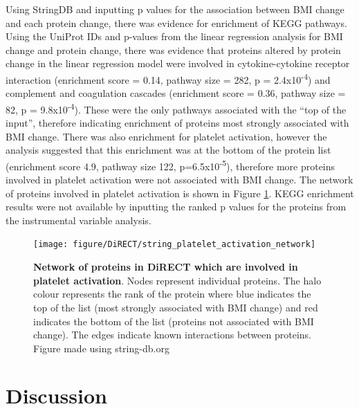 \documentclass[11pt,twoside]{bristolthesis}
\newcommand{\blandscape}{\begin{landscape}}
\newcommand{\elandscape}{\end{landscape}}
\begin{document}
Using StringDB and inputting p values for the association between BMI change and each protein change, there was evidence for enrichment of KEGG pathways. Using the UniProt IDs and p-values from the linear regression analysis for BMI change and protein change, there was evidence that proteins altered by protein change in the linear regression model were involved in cytokine-cytokine receptor interaction (enrichment score = 0.14, pathway size = 282, p = 2.4x10\textsuperscript{-4}) and complement and coagulation cascades (enrichment score = 0.36, pathway size = 82, p = 9.8x10\textsuperscript{-4}). These were the only pathways associated with the ``top of the input'', therefore indicating enrichment of proteins most strongly associated with BMI change. There was also enrichment for platelet activation, however the analysis suggested that this enrichment was at the bottom of the protein list (enrichment score 4.9, pathway size 122, p=6.5x10\textsuperscript{-5}), therefore more proteins involved in platelet activation were not associated with BMI change. The network of proteins involved in platelet activation is shown in Figure \ref{fig:platelet-enrichment}. KEGG enrichment results were not available by inputting the ranked p values for the proteins from the instrumental variable analysis.

\blandscape
\thispagestyle{empty}




\begin{figure}

{\centering \texttt{[image: figure/DiRECT/string\_platelet\_activation\_network]} 

}

\caption[Network of proteins in DiRECT which are involved in platelet activation.]{\textbf{Network of proteins in DiRECT which are involved in platelet activation}. Nodes represent individual proteins. The halo colour represents the rank of the protein where blue indicates the top of the list (most strongly associated with BMI change) and red indicates the bottom of the list (proteins not associated with BMI change). The edges indicate known interactions between proteins. Figure made using string-db.org}\label{fig:platelet-enrichment}
\end{figure}
\elandscape

\hypertarget{discussion-4}{%
\section{Discussion}\label{discussion-4}}
\end{document}
